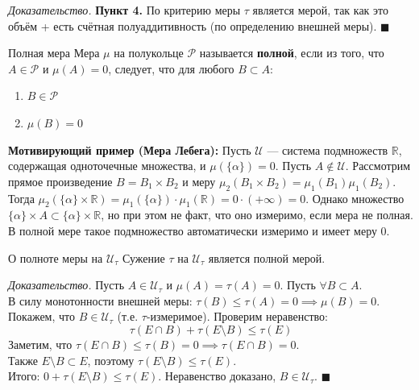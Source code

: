 \documentclass[12pt,a4paper]{article}
\newenvironment{Proof}[1][Доказательство]{\vspace{0.5em}\noindent\textit{#1.}\hspace{0.5em}\ignorespaces}{\hfill$\blacksquare$\vspace{1em}}
\begin{document}
\begin{Proof}
\textbf{Пункт 4.} По критерию меры $\tau$ является мерой, так как это объём + есть счётная полуаддитивность (по определению внешней меры).
\end{Proof}

\begin{Definition}{Полная мера}{}
Мера $\mu$ на полукольце $\mathcal{P}$ называется \textbf{полной}, если из того, что $A \in \mathcal{P}$ и $\mu(A) = 0$, следует, что для любого $B \subset A$:
\begin{enumerate}
    \item $B \in \mathcal{P}$
    \item $\mu(B) = 0$
\end{enumerate}
\end{Definition}

\noindent \textbf{Мотивирующий пример (Мера Лебега):} Пусть $\mathcal{U}$ — система подмножеств $\mathbb{R}$, содержащая одноточечные множества, и $\mu(\{\alpha\}) = 0$. Пусть $A \notin \mathcal{U}$. Рассмотрим прямое произведение $B = B_1 \times B_2$ и меру $\mu_2(B_1 \times B_2) = \mu_1(B_1)\mu_1(B_2)$.
Тогда $\mu_2(\{\alpha\} \times \mathbb{R}) = \mu_1(\{\alpha\}) \cdot \mu_1(\mathbb{R}) = 0 \cdot (+\infty) = 0$.
Однако множество $\{\alpha\} \times A \subset \{\alpha\} \times \mathbb{R}$, но при этом не факт, что оно измеримо, если мера не полная. В полной мере такое подмножество автоматически измеримо и имеет меру 0.

\begin{Lemma}{О полноте меры на $\mathcal{U}_\tau$}{}
Сужение $\tau$ на $\mathcal{U}_\tau$ является полной мерой.
\end{Lemma}

\begin{Proof}
Пусть $A \in \mathcal{U}_\tau$ и $\mu(A) = \tau(A) = 0$. Пусть $\forall B \subset A$. \\
В силу монотонности внешней меры: $\tau(B) \le \tau(A) = 0 \implies \mu(B) = 0$. \\
Покажем, что $B \in \mathcal{U}_\tau$ (т.е. $\tau$-измеримое). Проверим неравенство:
$$ \tau(E \cap B) + \tau(E \setminus B) \le \tau(E) $$
Заметим, что $\tau(E \cap B) \le \tau(B) = 0 \implies \tau(E \cap B) = 0$. \\
Также $E \setminus B \subset E$, поэтому $\tau(E \setminus B) \le \tau(E)$. \\
Итого: $0 + \tau(E \setminus B) \le \tau(E)$. Неравенство доказано, $B \in \mathcal{U}_\tau$.
\end{Proof}
\end{document}
